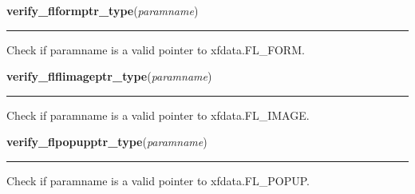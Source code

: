     \label{xformslib:library:verify_flformptr_type}

    \vspace{0.5ex}

\hspace{.8\funcindent}\begin{boxedminipage}{\funcwidth}

    \raggedright \textbf{verify\_flformptr\_type}(\textit{paramname})

    \vspace{-1.5ex}

    \rule{\textwidth}{0.5\fboxrule}
\setlength{\parskip}{2ex}

Check if paramname is a valid pointer to xfdata.FL\_FORM.
\setlength{\parskip}{1ex}
    \end{boxedminipage}

    \label{xformslib:library:verify_flflimageptr_type}

    \vspace{0.5ex}

\hspace{.8\funcindent}\begin{boxedminipage}{\funcwidth}

    \raggedright \textbf{verify\_flflimageptr\_type}(\textit{paramname})

    \vspace{-1.5ex}

    \rule{\textwidth}{0.5\fboxrule}
\setlength{\parskip}{2ex}

Check if paramname is a valid pointer to xfdata.FL\_IMAGE.
\setlength{\parskip}{1ex}
    \end{boxedminipage}

    \label{xformslib:library:verify_flpopupptr_type}

    \vspace{0.5ex}

\hspace{.8\funcindent}\begin{boxedminipage}{\funcwidth}

    \raggedright \textbf{verify\_flpopupptr\_type}(\textit{paramname})

    \vspace{-1.5ex}

    \rule{\textwidth}{0.5\fboxrule}
\setlength{\parskip}{2ex}

Check if paramname is a valid pointer to xfdata.FL\_POPUP.
\setlength{\parskip}{1ex}
    \end{boxedminipage}

